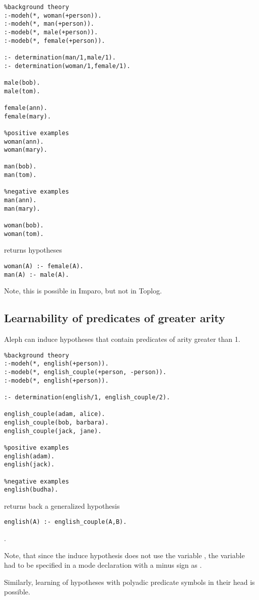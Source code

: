 \begin{lstlisting}
%background theory
:-modeh(*, woman(+person)).
:-modeh(*, man(+person)).
:-modeb(*, male(+person)).
:-modeb(*, female(+person)).

:- determination(man/1,male/1).
:- determination(woman/1,female/1).

male(bob).
male(tom).

female(ann).
female(mary).

%positive examples
woman(ann).
woman(mary).

man(bob).
man(tom).

%negative examples
man(ann).
man(mary).

woman(bob).
woman(tom).
\end{lstlisting}

returns hypotheses

\begin{lstlisting}
woman(A) :- female(A).
man(A) :- male(A).
\end{lstlisting}

Note, this is possible in Imparo, but not in Toplog.

\subsection{Learnability of predicates of greater arity}
Aleph can induce hypotheses that contain predicates of arity greater than 1.
\begin{lstlisting}
%background theory
:-modeh(*, english(+person)).
:-modeb(*, english_couple(+person, -person)).
:-modeb(*, english(+person)).

:- determination(english/1, english_couple/2).

english_couple(adam, alice).
english_couple(bob, barbara).
english_couple(jack, jane).

%positive examples
english(adam).
english(jack).

%negative examples
english(budha).
\end{lstlisting}

returns back a generalized hypothesis
\begin{lstlisting}
english(A) :- english_couple(A,B).
\end{lstlisting}.

Note, that since the induce hypothesis does not use the variable , the variable had to be specified in a mode declaration with a minus sign as .

Similarly, learning of hypotheses with polyadic predicate symbols in their head is possible.

